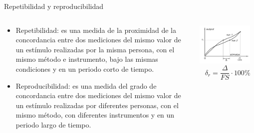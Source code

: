 \documentclass[aspectratio=169]{beamer}
\begin{document}
\begin{frame}{Repetibilidad y reproducibilidad}
    \begin{columns}[c, onlytextwidth]
        \begin{column}{0.60\textwidth}
            \begin{itemize}
                \item Repetibilidad: es una medida de la proximidad de la concordancia entre dos mediciones del mismo valor de un estímulo realizadas por la misma persona, con el mismo método e instrumento, bajo las mismas condiciones y en un periodo corto de tiempo. 
                \item Reproducibilidad: es una medida del grado de concordancia entre dos mediciones del mismo valor de un estímulo realizadas por diferentes personas, con el mismo método, con diferentes instrumentos y en un periodo largo de tiempo. 
            \end{itemize}
        \end{column}
        \begin{column}{0.35\textwidth}
            \includegraphics[width=0.9\textwidth]{fig/repeatibility.png}\cite{Fraden_2016}
            \begin{equation*}
                \delta_r = \dfrac{\Delta}{FS}\cdot 100\%
            \end{equation*}
        \end{column}
    \end{columns}
\end{frame}
\end{document}
